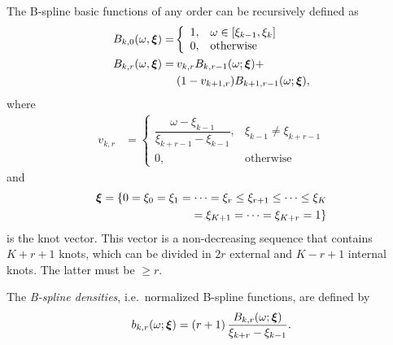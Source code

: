\documentclass[twocolumn,final]{svjour3}
\newcommand{\bm}[1]{\mbox{\boldmath $#1$}}
\begin{document}
The B-spline basic functions of any order can be recursively defined as
\begin{align*}
B_{k,0}(\omega, \bm{\xi})=&	
\left\{
\begin{array}{ll}
1, & \omega \in [\xi_{k-1}, \xi_{k}] \\
0, & \mbox{otherwise} 
\end{array}
\right.\\
B_{k,r}(\omega, \bm{\xi}) = & \:v_{k,r}B_{k,r-1}(\omega; \bm{\xi}) + \\
& \: (1-v_{k+1,r})B_{k+1,r-1}(\omega; \bm{\xi}),	
\end{align*}
where	   
\begin{align*}	   
v_{k,r}&=	
\left\{
\begin{array}{ll}
\dfrac{\omega - \xi_{k-1}}{\xi_{k+r-1} - \xi_{k-1}}, & \xi_{k-1} \neq \xi_{k+r-1}\\
0, & \mbox{otherwise} 
\end{array}
\right.
\end{align*}
and 
\begin{align*}
\bm{\xi} = \{0 = \xi_0 = \xi_1 = \cdots = \xi_r \leq \xi_{r+1} \leq \cdots \leq \xi_{K}\\ = \xi_{K+1} = \cdots = \xi_{K+r} = 1 \}
\end{align*}
is the knot vector.  This vector is a non-decreasing sequence that contains $K+r+1$ knots, which can be divided in $2r$ external and $K-r+1$ internal knots.  The latter must be $\geq r$.


The \textit{B-spline densities}, i.e.\ normalized B-spline functions, are defined by
\begin{align*}
b_{k,r}(\omega; \bm{\xi}) = \left(r+1\right) \dfrac{B_{k,r}(\omega;\bm{\xi})}{\xi_{k+r} - \xi_{k-1}}.
\end{align*}

\end{document}
